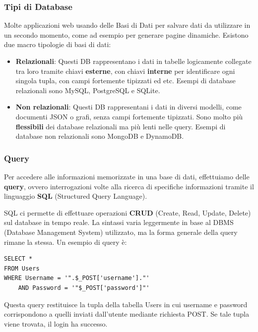 \documentclass{article}
\begin{document}
\subsubsection{Tipi di Database}
Molte applicazioni web usando delle Basi di Dati per salvare dati da utilizzare in un secondo momento, come ad esempio per generare pagine dinamiche. Esistono due macro tipologie di basi di dati:
\begin{itemize}
    \item \textbf{Relazionali}: Questi DB rappresentano i dati in tabelle logicamente collegate tra loro tramite chiavi \textbf{esterne}, con chiavi \textbf{interne} per identificare ogni singola tupla, con campi fortemente tipizzati ed etc. Esempi di database relazionali sono MySQL, PostgreSQL e SQLite.

    \item \textbf{Non relazionali}: Questi DB rappresentani i dati in diversi modelli, come documenti JSON o grafi, senza campi fortemente tipizzati. Sono molto più \textbf{flessibili} dei database relazionali ma più lenti nelle query. Esempi di database non relazionali sono MongoDB e DynamoDB.
\end{itemize}

\subsubsection{Query}
Per accedere alle informazioni memorizzate in una base di dati, effettuiamo delle \textbf{query}, ovvero interrogazioni volte alla ricerca di specifiche informazioni tramite il linguaggio \textbf{SQL} (Structured Query Language).

SQL ci permette di effettuare operazioni \textbf{CRUD} (Create, Read, Update, Delete) sul database in tempo reale. La sintassi varia leggermente in base al DBMS (Database Management System) utilizzato, ma la forma generale della query rimane la stessa. Un esempio di query è:
\begin{verbatim}
SELECT *
FROM Users
WHERE Username = '".$_POST['username']."'
    AND Password = '"$_POST['password']"'
\end{verbatim}
Questa query restituisce la tupla della tabella Users in cui username e password corrispondono a quelli inviati dall’utente mediante richiesta POST. Se tale tupla viene trovata, il login ha successo.   

\newpage
\end{document}
